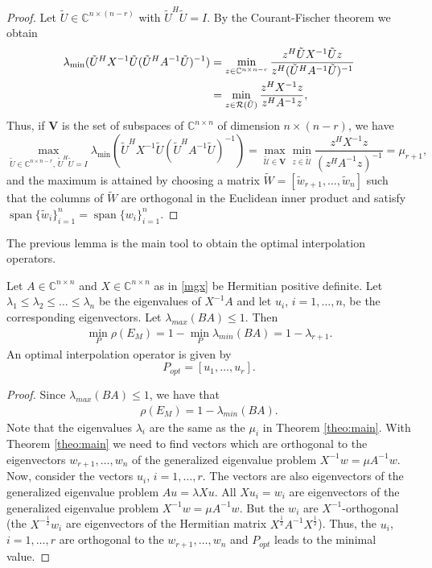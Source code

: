 \documentclass[final]{siamltex}
\newcommand{\uha}{^{\frac{1}{2}}}
\newcommand{\umha}{^{-\frac{1}{2}}}
\newcommand{\innCnn}{\in\mathbb{C}^{n\times n}}
\DeclareMathOperator*{\spann}{span}
\newcommand{\beqo}{\begin{eqnarray*}}
\newcommand{\beq}{\begin{eqnarray}}
\newcommand{\eeqo}{\end{eqnarray*}}
\newcommand{\eeq}{\end{eqnarray}}
\numberwithin{equation}{section}
\newcommand{\im} {{\cal R}}
\newcommand{\C}{\mathbb{C}}
\newcommand{\Cnn}{\mathbb{C}^{n \times n}}
\newcommand{\Cnnr}{\mathbb{C}^{n \times n-r}}
\begin{document}
\begin{proof}
Let $\tilde{U} \in \C^{n \times (n-r)}$ with $\tilde{U}^H\tilde{U} = I$. By the
Courant-Fischer theorem we obtain 
\begin{align*}
\lambda_{\min} (\tilde U^HX^{-1}\tilde U (\tilde U^HA^{-1}\tilde U)^{-1}) & = \min_{z \in \Cnnr} \frac{z^H \tilde U X^{-1} \tilde U z }{ z^H
(\tilde U^H A^{-1} \tilde U)^{-1}}\\
& = \min_{ z \in \im(\tilde U)}\frac{z^{H} X^{-1}z}{z^HA^{-1}z}, 
\end{align*}
Thus, if $\mathbf{V}$ is the set of subspaces of $\Cnn$ of dimension $n \times
(n-r)$, we have
\[\max_{\tilde{U} \in \Cnnr, \, \tilde{U}^H\tilde U = I }
\lambda_{\min} (\tilde U^HX^{-1}\tilde U (\tilde U^HA^{-1}\tilde U)^{-1}) =
\max_{\tilde{\mathcal{U}} \in \mathbf V } \min_{z \in \tilde{\mathcal{U}}}
\frac{z^H X^{-1} z}{(z^HA^{-1}z)^{-1}}  = \mu_{r+1},
\]
and the maximum is attained by choosing a matrix $\tilde W =
[\tilde w_{r+1}, \ldots, \tilde w _{n}]$ such that 
the columns of $\tilde W$ are orthogonal in the Euclidean inner 
product and satisfy
$\spann\{\tilde{w}_i\}_{i=1}^n = \spann\{w_i\}_{i=1}^n$. 
\end{proof}

The previous lemma is the main tool to obtain the optimal interpolation
operators.

\begin{theorem}\label{theo:main}
Let $A \innCnn$ and $ X \innCnn$ as in \eqref{mgx} be Hermitian positive
definite. Let $
\lambda_1 \leq \lambda_2 \leq \ldots \leq  \lambda_n $
be the  eigenvalues of $X^{-1}A$  and let $u_i$, $i = 1, \ldots, n$, be the
corresponding eigenvectors. Let  $\lambda_{max}(BA) \leq 1$. Then
\beq
\min_{P} \rho(E_{M}) =  1 - \min_{P}\lambda_{min}(BA) = 1 - \lambda_{r+1}.
\eeq
An optimal interpolation operator is given by 
\[
P_{opt} = [u_{1}, \ldots , u_r].
\]
\end{theorem}
\begin{proof}
Since $\lambda_{max}(BA) \leq 1$,  we have that 
\beqo
\rho(E_{M}) =  1 - \lambda_{min}(BA).
\eeqo
Note that the eigenvalues $\lambda_i $ are  the same as the $\mu_i$ in Theorem
\ref{theo:main}.
With  Theorem  \ref{theo:main} we need  to find vectors which are orthogonal to
the eigenvectors  $w_{r+1}, \ldots , w_n$ of the generalized eigenvalue problem
$X^{-1}w = \mu A^{-1}w$. Now, consider the vectors $u_i$, $i = 1, \ldots, r$.
The vectors are also eigenvectors of the generalized eigenvalue problem  $Au =
\lambda Xu$. All  $Xu_i = w_i$  are  eigenvectors  of the generalized
eigenvalue problem $X^{-1}w = \mu A^{-1}w$. But the $w_i$ are
$X^{-1}$-orthogonal (the $X\umha w_i$ are eigenvectors of the Hermitian matrix
$X\uha A^{-1} X\uha$). Thus, the $u_i$, $i = 1, \ldots, r$ are  orthogonal to
the  $w_{r+1}, \ldots , w_n$  and $P_{opt}$   leads   to the minimal value.
\end{proof}
\end{document}
